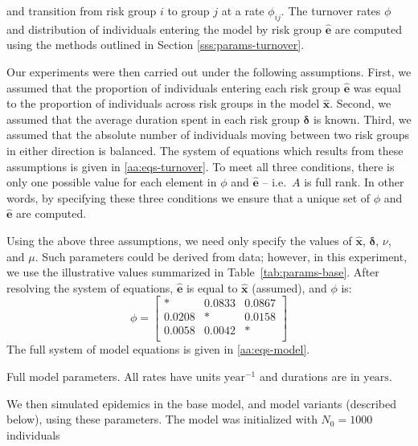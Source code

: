 and transition from risk group $i$ to group $j$ at a rate $\phi_{ij}$.
The turnover rates $\phi$ and
distribution of individuals entering the model by risk group $\bm{\hat{e}}$
are computed using the methods outlined in
Section \ref{sss:params-turnover}.
\par
Our experiments were then carried out under the following assumptions.
First, we assumed that
the proportion of individuals entering each risk group $\bm{\hat{e}}$
was equal to the proportion of individuals across risk groups in the model $\bm{\hat{x}}$.
Second, we assumed that
the average duration spent in each risk group $\bm{\delta}$ is known.
Third, we assumed that
the absolute number of individuals moving between two risk groups in either direction is balanced.
The system of equations which results from these assumptions
is given in \ref{aa:eqs-turnover}.
To meet all three conditions, there is only one possible value
for each element in $\phi$ and $\bm{\hat{e}}$
-- i.e.\ $A$ is full rank.
In other words, by specifying these three conditions
we ensure that a unique set of $\phi$ and $\bm{\hat{e}}$ are computed.
\par
Using the above three assumptions,
we need only specify the values of $\bm{\hat{x}}$, $\bm{\delta}$, $\nu$, and $\mu$.
Such parameters could be derived from data;
however, in this experiment, we use the illustrative values summarized in
Table~\ref{tab:params-base}.
After resolving the system of equations,
$\bm{\hat{e}}$ is equal to $\bm{\hat{x}}$ (assumed), and $\phi$ is:
\begin{equation} %
\phi = \left[\begin{array}{ccc}
*      & 0.0833 & 0.0867 \\
0.0208 & *      & 0.0158 \\
0.0058 & 0.0042 & *      \\
\end{array}\right]
\end{equation}
The full system of model equations is given in \ref{aa:eqs-model}.
\begin{table}
  \centering
  \caption{Full model parameters.
    All rates have units $\mathrm{year}^{-1}$ and durations are in $\mathrm{years}$.}
  \label{tab:params-base}
  
\end{table}
\par
We then simulated epidemics in the base model,
and model variants (described below), using these parameters.
The model was initialized with $N_0 = 1000$ individuals
